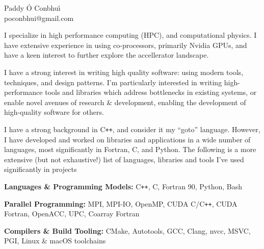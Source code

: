 \documentclass[11pt]{article}
\newcommand{\resumeSection}[1]{
    \par
    \large {\sc {#1}}
    \par
    \vspace{-0.9\baselineskip}
    \hrulefill
    \vspace{0.25\baselineskip}
    \par
}
\newenvironment{resumeSubSectionBody}{
    \par
    \vspace{-0.4\parskip}
    \begin{small}
    \par
} {
    \par
    \end{small}
    \par
}
\newenvironment{resumeDescription}{
    \vspace{-0.5\baselineskip}
    \begin{description}
} {
    \end{description}
}
\begin{document}


%
%
\begin{center}
    { \huge \textbf \sc Paddy \'O Conbhu\'\i } \\
    poconbhui@gmail.com
\end{center}




\resumeSection{Software Development}


%
%
\begin{resumeSubSectionBody}

    I specialize in high performance computing (HPC), and computational physics.
    I have extensive experience in using co-processors, primarily Nvidia GPUs,
    and have a keen interest to further explore the accellerator landscape.

    I have a strong interest in writing high quality software: using modern
    tools, techniques, and design patterns.
    I'm particularly interested in writing high-performance tools and libraries
    which address bottlenecks in existing systems, or enable novel avenues of
    research \& development, enabling the development of high-quality software
    for others.

    I have a strong background in C\verb!++!, and consider it my ``goto''
    language.
    However, I have developed and worked on libraries and applications in a wide
    number of languages, most significantly in Fortran, C, and Python.
    The following is a more extensive (but not exhaustive!) list of languages,
    libraries and tools I've used significantly in projects

    \begin{resumeDescription}
        \item{\bf Languages \& Programming Models:}
            C\verb!++!, C, Fortran 90, Python, Bash

        \item{\bf Parallel Programming:}
            MPI, MPI-IO, OpenMP, CUDA C/C\verb!++!, CUDA Fortran,
            OpenACC, UPC, Coarray Fortran

        \item{\bf Compilers \& Build Tooling:}
            CMake, Autotools, GCC, Clang, nvcc, MSVC, PGI,
            Linux \& macOS toolchains


\end{resumeDescription}
\end{resumeSubSectionBody}
\end{document}
